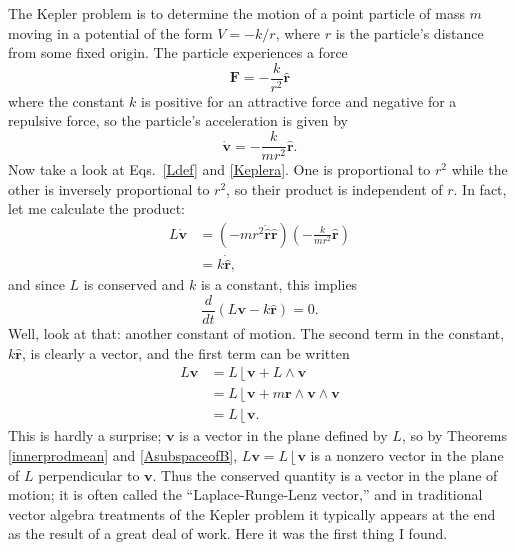 \documentclass{utarticle}
\DeclareMathOperator{\rin}{\lfloor}
\DeclareMathOperator{\out}{\wedge}
\begin{document}
The Kepler problem is to determine the motion of a point particle of mass $m$ 
moving in a potential of the form $V=-k/r$, where $r$ is the particle's distance from
some fixed origin.  The particle experiences a force
\begin{equation}
\bm{F} = -\frac{k}{r^2}\bm{\hat{r}}
\end{equation}
where the constant $k$ is positive for an attractive force and negative for a 
repulsive force, so the particle's acceleration is given by
\begin{equation}
\dot{\bm{v}} = -\frac{k}{mr^2}\bm{\hat{r}}.
\label{Keplera}
\end{equation}
Now take a look at Eqs.~\eqref{Ldef} and \eqref{Keplera}.  One is proportional 
to $r^2$ while the other is inversely proportional to $r^2$, so their product 
is independent of $r$.  In fact, let me calculate the product:
\begin{align}
L \dot{\bm{v}} & = \left(-mr^2 \dot{\bm{\hat{r}}} \bm{\hat{r}}\right) 
                   \left(-\frac{k}{mr^2}\bm{\hat{r}}\right) \nonumber \\
               & = k \dot{\bm{\hat{r}}}, \nonumber
\end{align}
and since $L$ is conserved and $k$ is a constant, this implies
\begin{equation} 
\frac{d}{dt}\left(L\bm{v} - k\bm{\hat{r}}\right) = 0. 
\end{equation}
Well, look at that: another constant of motion.  The second term in the constant, 
$k\bm{\hat{r}}$, is clearly a vector, and the first term can be written
\begin{align}
L \bm{v} & = L \rin \bm{v} + L \out \bm{v} \nonumber \\
         & = L \rin \bm{v} + m \bm{r} \out \bm{v} \out \bm{v} \nonumber \\
         & = L \rin \bm{v}.
\end{align}
This is hardly a surprise; $\bm{v}$ is a vector in the plane defined by $L$, so by 
Theorems \ref{innerprodmean} and \ref{AsubspaceofB}, $L \bm{v} = L \rin \bm{v}$ 
is a nonzero 
vector in the plane of $L$ perpendicular to $\bm{v}$.  Thus the conserved quantity 
is a vector in the plane of motion; it is often called the ``Laplace-Runge-Lenz 
vector,'' and in traditional vector algebra treatments of the Kepler problem it typically 
appears at the end as the result of a great deal of work.  Here it was the first thing I found.
\end{document}
